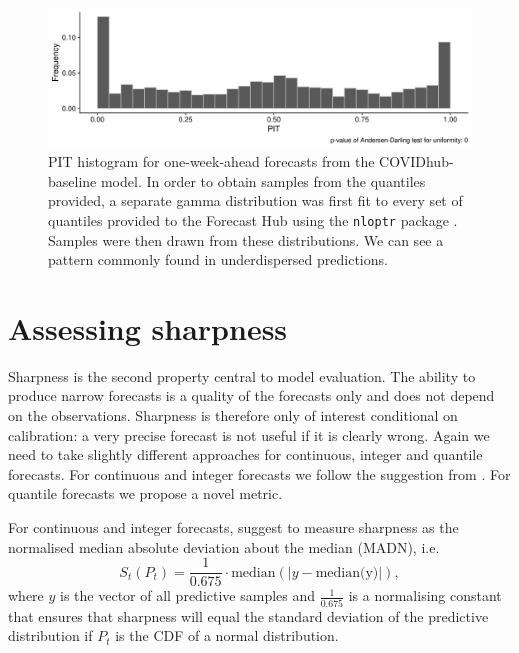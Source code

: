\documentclass[
]{book}
\begin{document}
\begin{figure}
\includegraphics[width=1\linewidth]{../visualisation/chapter-3-evaluation/pit-baseline-model} \caption{PIT histogram for one-week-ahead forecasts from the COVIDhub-baseline model. In order to obtain samples from the quantiles provided, a separate gamma distribution was first fit to every set of quantiles provided to the Forecast Hub using the \texttt{nloptr} package \citep{R-nloptr}. Samples were then drawn from these distributions. We can see a pattern commonly found in underdispersed predictions.}\label{fig:pit-baseline-model}
\end{figure}

\hypertarget{assessing-sharpness}{%
\section{Assessing sharpness}\label{assessing-sharpness}}

Sharpness is the second property central to model evaluation. The ability to produce narrow forecasts is a quality of the forecasts only and does not depend on the observations. Sharpness is therefore only of interest conditional on calibration: a very precise forecast is not useful if it is clearly wrong. Again we need to take slightly different approaches for continuous, integer and quantile forecasts. For continuous and integer forecasts we follow the suggestion from \citet{funkAssessingPerformanceRealtime2019}. For quantile forecasts we propose a novel metric.

For continuous and integer forecasts, \citet{funkAssessingPerformanceRealtime2019} suggest to measure sharpness as the normalised median absolute deviation about the median (MADN), i.e.~
\[ S_t(P_t) = \frac{1}{0.675} \cdot \text{median}(|y - \text{median(y)}|), \]
where \(y\) is the vector of all predictive samples and \(\frac{1}{0.675}\) is a normalising constant that ensures that sharpness will equal the standard deviation of the predictive distribution if \(P_t\) is the CDF of a normal distribution.
\end{document}
